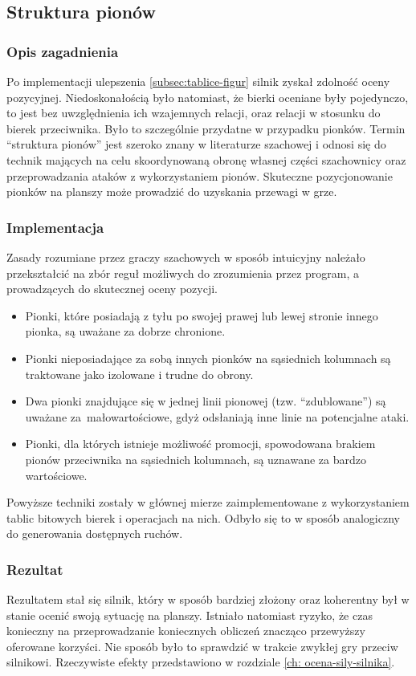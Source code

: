 \subsection{Struktura pionów}
\label{subsec:struktura-pionow}

\subsubsection{Opis zagadnienia}
Po implementacji ulepszenia \ref{subsec:tablice-figur} silnik zyskał zdolność oceny pozycyjnej.
Niedoskonałością było natomiast, że bierki oceniane były pojedynczo, to jest bez uwzględnienia ich wzajemnych relacji, oraz relacji w stosunku do bierek przeciwnika.
Było to szczególnie przydatne w przypadku pionków.
Termin \enquote{struktura pionów} jest szeroko znany w literaturze szachowej \cite*{stuktura-pionow} i odnosi się do technik mających na celu skoordynowaną obronę własnej części szachownicy oraz przeprowadzania ataków z wykorzystaniem pionów.
Skuteczne pozycjonowanie pionków na planszy może prowadzić do uzyskania przewagi w grze.

\subsubsection{Implementacja}
Zasady rozumiane przez graczy szachowych w sposób intuicyjny należało przekształcić na zbór reguł możliwych do zrozumienia przez program, a prowadzących do skutecznej oceny pozycji.
\begin{itemize}
    \item Pionki, które posiadają z tyłu po swojej prawej lub lewej stronie innego pionka, są uważane za dobrze chronione.
    \item Pionki nieposiadające za sobą innych pionków na sąsiednich kolumnach są traktowane jako izolowane i trudne do obrony.
    \item Dwa pionki znajdujące się w jednej linii pionowej (tzw. \enquote{zdublowane}) są uważane za~małowartościowe, gdyż odsłaniają inne linie na potencjalne ataki.
    \item Pionki, dla których istnieje możliwość promocji, spowodowana brakiem pionów przeciwnika na sąsiednich kolumnach, są uznawane za bardzo wartościowe.
\end{itemize}

Powyższe techniki zostały w głównej mierze zaimplementowane z wykorzystaniem tablic bitowych bierek i operacjach na nich.
Odbyło się to w sposób analogiczny do generowania dostępnych ruchów.

\subsubsection{Rezultat}
Rezultatem stał się silnik, który w sposób bardziej złożony oraz koherentny był w stanie ocenić swoją sytuację na planszy.
Istniało natomiast ryzyko, że czas konieczny na przeprowadzanie koniecznych obliczeń znacząco przewyższy oferowane korzyści.
Nie sposób było to sprawdzić w trakcie zwykłej gry przeciw silnikowi.
Rzeczywiste efekty przedstawiono w rozdziale \ref{ch: ocena-sily-silnika}.